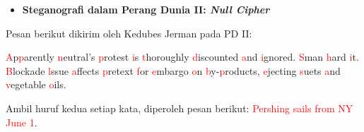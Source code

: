 \documentclass{article}
\begin{document}

\begin{itemize}
    \item \textbf{Steganografi dalam Perang Dunia II: \textit{Null Cipher}}
\end{itemize}

Pesan berikut dikirim oleh Kedubes Jerman pada PD II:

\textcolor{red}{A}p\textcolor{red}{p}arently \textcolor{red}{n}eutral's \textcolor{red}{p}rotest \textcolor{red}{i}s \textcolor{red}{t}horoughly \textcolor{red}{d}iscounted \textcolor{red}{a}nd \textcolor{red}{i}gnored. \textcolor{red}{S}man \textcolor{red}{h}ard \textcolor{red}{i}t. \textcolor{red}{B}lockade \textcolor{red}{l}ssue \textcolor{red}{a}ffects \textcolor{red}{p}retext \textcolor{red}{f}or \textcolor{red}{e}mbargo \textcolor{red}{o}n \textcolor{red}{b}y-\textcolor{red}{p}roducts, \textcolor{red}{e}jecting \textcolor{red}{s}uets \textcolor{red}{a}nd \textcolor{red}{v}egetable \textcolor{red}{o}ils.

Ambil huruf kedua setiap kata, diperoleh pesan berikut: \textcolor{red}{Pershing sails from NY June 1}.
\end{document}
